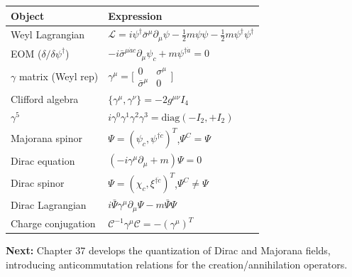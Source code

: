 \documentclass[12pt]{article}
\begin{document}
\begin{center}
\renewcommand{\arraystretch}{1.4}
\begin{tabular}{@{}ll@{}}
  \toprule
  Object & Expression \\
  \midrule
  Weyl Lagrangian & $\mathcal{L}=i\psi^\dagger\bar\sigma^\mu\partial_\mu\psi
    -\frac{1}{2}m\psi\psi - \frac{1}{2}m\psi^\dagger\psi^\dagger$ \\
  EOM ($\delta/\delta\psi^\dagger$) & $-i\bar\sigma^{\mu\dot{a}c}\partial_\mu\psi_c
    +m\psi^{\dagger\dot{a}}=0$ \\
  $\gamma$ matrix (Weyl rep) & $\gamma^\mu=\bigl[\begin{smallmatrix}0&\sigma^\mu\\
    \bar\sigma^\mu&0\end{smallmatrix}\bigr]$ \\
  Clifford algebra & $\{\gamma^\mu,\gamma^\nu\}=-2g^{\mu\nu}I_4$ \\
  $\gamma^5$ & $i\gamma^0\gamma^1\gamma^2\gamma^3
    =\mathrm{diag}(-I_2,+I_2)$ \\
  Majorana spinor & $\Psi=(\psi_c,\psi^{\dagger\dot{c}})^T$,\quad $\Psi^C=\Psi$ \\
  Dirac equation & $(-i\gamma^\mu\partial_\mu+m)\Psi=0$ \\
  Dirac spinor & $\Psi=(\chi_c,\xi^{\dagger\dot{c}})^T$,\quad $\Psi^C\neq\Psi$ \\
  Dirac Lagrangian & $i\bar\Psi\gamma^\mu\partial_\mu\Psi - m\bar\Psi\Psi$ \\
  Charge conjugation & $\mathcal{C}^{-1}\gamma^\mu\mathcal{C}=-(\gamma^\mu)^T$ \\
  \bottomrule
\end{tabular}
\end{center}

\bigskip
\noindent\textbf{Next:} Chapter 37 develops the quantization of
Dirac and Majorana fields, introducing anticommutation relations for
the creation/annihilation operators.
\end{document}
